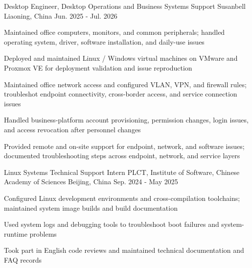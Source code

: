 
\begin{cventries}

  \cventry
    {Desktop Engineer, Desktop Operations and Business Systems Support}
    {Susanbell}
    {Liaoning, China}
    {Jun. 2025 - Jul. 2026}
    {
      \begin{cvitems}
        \item {Maintained office computers, monitors, and common peripherals; handled operating system, driver, software installation, and daily-use issues}
        \item {Deployed and maintained Linux / Windows virtual machines on VMware and Proxmox VE for deployment validation and issue reproduction}
        \item {Maintained office network access and configured VLAN, VPN, and firewall rules; troubleshot endpoint connectivity, cross-border access, and service connection issues}
        \item {Handled business-platform account provisioning, permission changes, login issues, and access revocation after personnel changes}
        \item {Provided remote and on-site support for endpoint, network, and software issues; documented troubleshooting steps across endpoint, network, and service layers}
      \end{cvitems}
    }

  \cventry
    {Linux Systems Technical Support Intern}
    {PLCT, Institute of Software, Chinese Academy of Sciences}
    {Beijing, China}
    {Sep. 2024 - May 2025}
    {
      \begin{cvitems}
        \item {Configured Linux development environments and cross-compilation toolchains; maintained system image builds and build documentation}
        \item {Used system logs and debugging tools to troubleshoot boot failures and system-runtime problems}
        \item {Took part in English code reviews and maintained technical documentation and FAQ records}
      \end{cvitems}
    }

\end{cventries}
